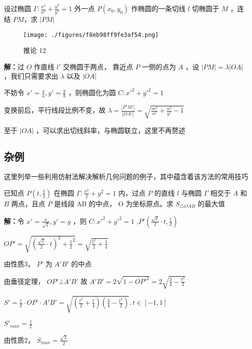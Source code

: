 \begin{corollary}{}
设过椭圆 $\displaystyle{\Gamma:\frac{x^2}{a^2}+\frac{y^2}{b^2}=1}$ 外一点 $\displaystyle{P(x_0,y_0)}$ 作椭圆的一条切线 $\displaystyle{l}$ 切椭圆于 $\displaystyle{M}$ ，连结 $\displaystyle{PM}$，求 $\displaystyle{|PM|}$
\begin{figure}[ht]
\centering
\texttt{[image: ./figures/f8eb98ff9fe3af54.png]}
\caption{推论 12} \label{fig_affine_9}
\end{figure}
\textbf{解：}过 $\displaystyle{O}$ 作直线 $\displaystyle{l'}$ 交椭圆于两点， 靠近点 $\displaystyle{P}$ 一侧的点为 $\displaystyle{A}$ ，设 $\displaystyle{|PM|=\lambda|OA|}$ ，我们只需要求出 $\displaystyle{\lambda}$ 以及 $\displaystyle{|OA|}$ 

不妨令 $\displaystyle{x'=\frac{x}{a},y'=\frac{y}{b}}$ ，则椭圆化为圆 $\displaystyle{C:x'^2+y'^2=1}$

变换前后，平行线段比例不变，故 $\displaystyle{\lambda=\frac{|P'M'|}{|OA'|}=\sqrt{\frac{m^2}{a^2}+\frac{n^2}{b^2}-1}}$ 

至于 $\displaystyle{|OA|}$ ，可以求出切线斜率，与椭圆联立，这里不再赘述
\end{corollary}

\subsection{杂例}
这里列举一些利用仿射法解决解析几何问题的例子，其中蕴含着该方法的常用技巧
\begin{example}{}
已知点 $\displaystyle{P\left(t,\frac{1}{2}\right)}$ 在椭圆 $\displaystyle{\Gamma:\frac{x^2}{2}+y^2=1}$ 内，过点 $\displaystyle{P}$ 的直线 $\displaystyle{l}$ 与椭圆 $\displaystyle{\Gamma}$ 相交于 $\displaystyle{A}$ 和 $\displaystyle{B}$ 两点，且点 $\displaystyle{P}$ 是线段 AB 的中点， O 为坐标原点。求 $\displaystyle{S_{\triangle OAB}}$ 的最大值

\textbf{解：}令 $\displaystyle{x'=\frac{x}{\sqrt{2}},y'=y}$ ，则 $\displaystyle{C:x'^2+y'^2=1}$ ,$\displaystyle{P'\left(\frac{\sqrt{2}}{2}\cdot t,\frac{1}{2}\right)}$

$\displaystyle{OP'=\sqrt{\left(\frac{\sqrt{2}}{2}\cdot t\right)^2+{\frac{1}{2}}^2}=\sqrt{\frac{t^2}{2}+\frac{1}{4}}}$

由性质3， $\displaystyle{P'}$ 为 $\displaystyle{A'B'}$ 的中点

由垂径定理， $\displaystyle{OP'\bot A'B'}$ 
故 $\displaystyle{A'B'=2\sqrt{1-OP'^2}=2\sqrt{\frac{3}{4}-\frac{t^2}{2}}}$

$\displaystyle{S'=\frac{1}{2}\cdot OP' \cdot A'B'=\sqrt{\left(\frac{t^2}{2}+\frac{1}{4}\right)\left(\frac{3}{4}-\frac{t^2}{2}\right)},t\in[-1,1]}$

$\displaystyle{S'_{max}=\frac{1}{2}}$

由性质2， $\displaystyle{S_{max}=\frac{\sqrt{2}}{2}}$ 
\end{example}

